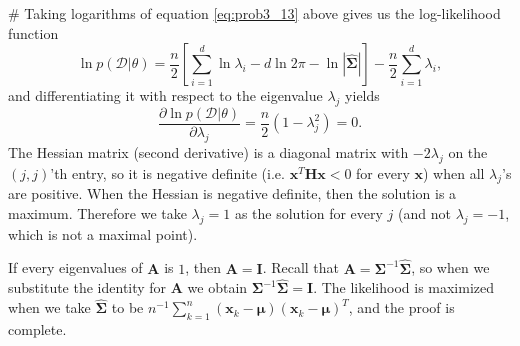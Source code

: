 \documentclass[12pt, a4paper]{article}
\newcommand{\D}{\mathcal{D}}
\newcommand{\vect}[1]{\bm{#1}}
\begin{document}
\begin{easylist}[enumerate]
# Taking logarithms of equation \eqref{eq:prob3_13} above gives us the log-likelihood function
\begin{equation*}
	\ln p(\D | \theta) = \frac{n}{2} \left[ \sum_{i=1}^{d} \ln \lambda_i - d \ln 2 \pi - \ln | \hat{\vect{\Sigma}} |  \right] - \frac{n}{2} \sum_{i=1}^{d} \lambda_i,
\end{equation*}
and differentiating it with respect to the eigenvalue $\lambda_j$ yields 
\begin{equation*}
	\frac{\partial \ln p(\D | \theta)}{\partial \lambda_j} = \frac{n}{2} \left(1 - \lambda_j^2 \right) = 0.
\end{equation*}
The Hessian matrix (second derivative) is a diagonal matrix with $-2\lambda_j$ on the $(j, j)$'th entry, so it is negative definite (i.e. $\vect{x}^T \vect{H} \vect{x} < 0$ for every $\vect{x}$) when all $\lambda_j$'s are positive.
When the Hessian is negative definite, then the solution is a maximum.
Therefore we take $\lambda_j = 1$ as the solution for every $j$ (and not $\lambda_j = -1$, which is not a maximal point).

If every eigenvalues of $\vect{A}$ is $1$, then $\vect{A} = \vect{I}$.
Recall that $\vect{A} = \vect{\Sigma}^{-1} \hat{\vect{\Sigma}}$, so when we substitute the identity for $\vect{A}$ we obtain $\vect{\Sigma}^{-1} \hat{\vect{\Sigma}} = \vect{I}$.
The likelihood is maximized when we take $\hat{\vect{\Sigma}}$ to be $ n^{-1} \sum_{k=1}^{n} \left( \vect{x}_k - \vect{\mu} \right) \left( \vect{x}_k - \vect{\mu} \right)^T$, and the proof is complete.
\end{easylist}
\end{document}
